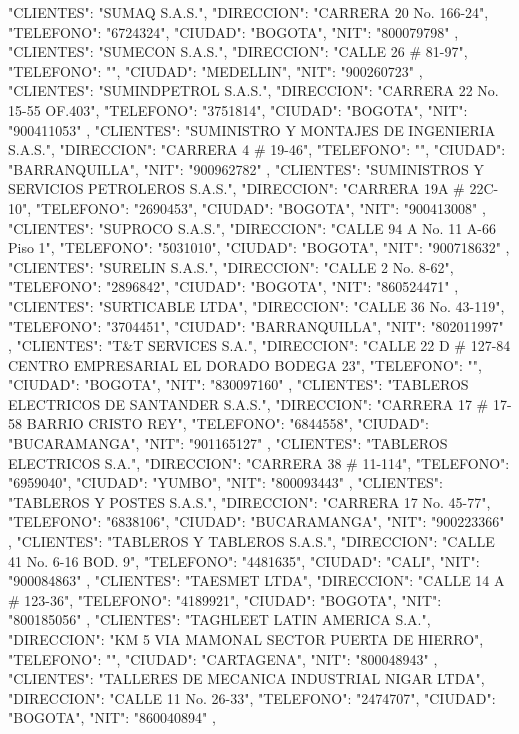    {
   "CLIENTES": "SUMAQ S.A.S.",
   "DIRECCION": "CARRERA 20 No. 166-24",
   "TELEFONO": "6724324",
   "CIUDAD": "BOGOTA",
   "NIT": "800079798"
   },
   {
   "CLIENTES": "SUMECON S.A.S.",
   "DIRECCION": "CALLE 26 # 81-97",
   "TELEFONO": "",
   "CIUDAD": "MEDELLIN",
   "NIT": "900260723"
   },
   {
   "CLIENTES": "SUMINDPETROL S.A.S.",
   "DIRECCION": "CARRERA 22 No. 15-55 OF.403",
   "TELEFONO": "3751814",
   "CIUDAD": "BOGOTA",
   "NIT": "900411053"
   },
   {
   "CLIENTES": "SUMINISTRO Y MONTAJES DE INGENIERIA S.A.S.",
   "DIRECCION": "CARRERA 4 # 19-46",
   "TELEFONO": "",
   "CIUDAD": "BARRANQUILLA",
   "NIT": "900962782"
   },
   {
   "CLIENTES": "SUMINISTROS Y SERVICIOS PETROLEROS S.A.S.",
   "DIRECCION": "CARRERA 19A # 22C-10",
   "TELEFONO": "2690453",
   "CIUDAD": "BOGOTA",
   "NIT": "900413008"
   },
   {
   "CLIENTES": "SUPROCO S.A.S.",
   "DIRECCION": "CALLE 94 A No. 11 A-66 Piso 1",
   "TELEFONO": "5031010",
   "CIUDAD": "BOGOTA",
   "NIT": "900718632"
   },
   {
   "CLIENTES": "SURELIN S.A.S.",
   "DIRECCION": "CALLE 2 No. 8-62",
   "TELEFONO": "2896842",
   "CIUDAD": "BOGOTA",
   "NIT": "860524471"
   },
   {
   "CLIENTES": "SURTICABLE LTDA",
   "DIRECCION": "CALLE 36 No. 43-119",
   "TELEFONO": "3704451",
   "CIUDAD": "BARRANQUILLA",
   "NIT": "802011997"
   },
   {
   "CLIENTES": "T&T SERVICES S.A.",
   "DIRECCION": "CALLE 22 D # 127-84 CENTRO EMPRESARIAL EL DORADO BODEGA 23",
   "TELEFONO": "",
   "CIUDAD": "BOGOTA",
   "NIT": "830097160"
   },
   {
   "CLIENTES": "TABLEROS ELECTRICOS DE SANTANDER S.A.S.",
   "DIRECCION": "CARRERA 17 # 17-58 BARRIO CRISTO REY",
   "TELEFONO": "6844558",
   "CIUDAD": "BUCARAMANGA",
   "NIT": "901165127"
   },
   {
   "CLIENTES": "TABLEROS ELECTRICOS S.A.",
   "DIRECCION": "CARRERA 38 # 11-114",
   "TELEFONO": "6959040",
   "CIUDAD": "YUMBO",
   "NIT": "800093443"
   },
   {
   "CLIENTES": "TABLEROS Y POSTES S.A.S.",
   "DIRECCION": "CARRERA 17 No. 45-77",
   "TELEFONO": "6838106",
   "CIUDAD": "BUCARAMANGA",
   "NIT": "900223366"
   },
   {
   "CLIENTES": "TABLEROS Y TABLEROS S.A.S.",
   "DIRECCION": "CALLE 41 No. 6-16 BOD. 9",
   "TELEFONO": "4481635",
   "CIUDAD": "CALI",
   "NIT": "900084863"
   },
   {
   "CLIENTES": "TAESMET LTDA",
   "DIRECCION": "CALLE 14 A # 123-36",
   "TELEFONO": "4189921",
   "CIUDAD": "BOGOTA",
   "NIT": "800185056"
   },
   {
   "CLIENTES": "TAGHLEET LATIN AMERICA S.A.",
   "DIRECCION": "KM 5 VIA MAMONAL SECTOR PUERTA DE HIERRO",
   "TELEFONO": "",
   "CIUDAD": "CARTAGENA",
   "NIT": "800048943"
   },
   {
   "CLIENTES": "TALLERES DE MECANICA INDUSTRIAL NIGAR LTDA",
   "DIRECCION": "CALLE 11 No. 26-33",
   "TELEFONO": "2474707",
   "CIUDAD": "BOGOTA",
   "NIT": "860040894"
   },
